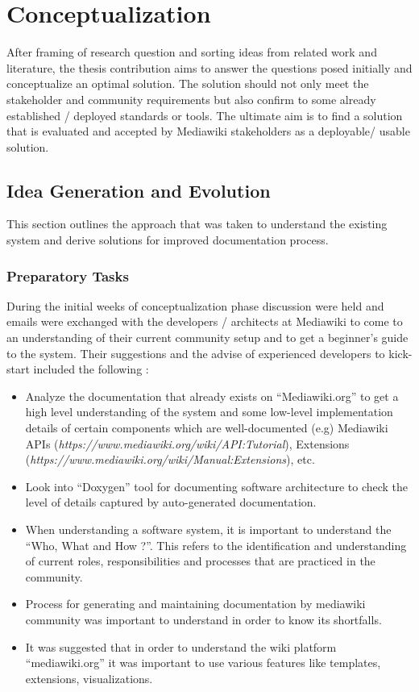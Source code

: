 \chapter{Conceptualization}\label{chapter:Conceptualization}
\indent After framing of research question and sorting ideas from related work and literature, the thesis contribution aims to answer the questions posed initially and conceptualize an optimal solution. The solution should not only meet the stakeholder and community requirements but also confirm to some already established / deployed standards or tools. The ultimate aim is to find a solution that is evaluated and accepted by Mediawiki stakeholders as a deployable/ usable solution. 
\section{Idea Generation and Evolution}
\indent This section outlines the approach that was taken to understand the existing system and derive solutions for improved documentation process. 

\subsection{Preparatory Tasks}
\indent During the initial weeks of conceptualization phase discussion were held and emails were exchanged with the developers / architects at Mediawiki to come to an understanding of their current community setup and to get a beginner's guide to the system. Their suggestions and the advise of experienced developers to kick-start included the following :
\begin{itemize}
\item Analyze the documentation that already exists on \enquote{Mediawiki.org} to get a high level understanding of the system and some low-level implementation details of certain components which are well-documented (e.g) Mediawiki APIs (\emph{https://www.mediawiki.org/wiki/API:Tutorial}), Extensions (\emph{https://www.mediawiki.org/wiki/Manual:Extensions}), etc.
\item Look into \enquote{Doxygen} tool for documenting software architecture to check the level of details captured by auto-generated documentation.
\item When understanding a software system, it is important to understand the \enquote{Who, What and How ?}. This refers to the identification and understanding of current roles, responsibilities and processes that are practiced in the community.
\item Process for generating and maintaining documentation by mediawiki community was important to understand in order to know its shortfalls.
\item It was suggested that in order to understand the wiki platform \enquote{mediawiki.org} it was important to use various features like templates, extensions, visualizations.
\end{itemize}



